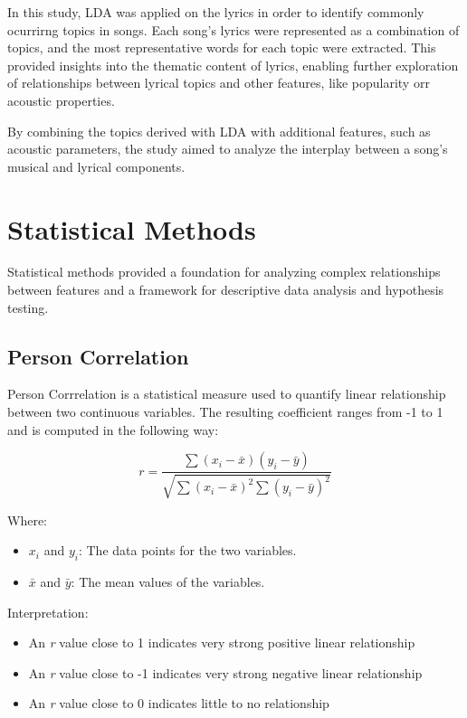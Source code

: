 In this study, LDA was applied on the lyrics in order to identify commonly
ocurrirng topics in songs. Each song's lyrics were represented as a combination
of topics, and the most representative words for each topic were extracted.
This provided insights into the thematic content of lyrics, enabling further
exploration of relationships between lyrical topics and other features, like
popularity orr acoustic properties.

By combining the topics derived with LDA with additional features, such as
acoustic parameters, the study aimed to analyze the interplay between a song's
musical and lyrical components.


\section{Statistical Methods}
\label{sec:statisticalmethods}

Statistical methods provided a foundation for analyzing complex relationships
between features and a framework for descriptive data analysis and hypothesis
testing.

\subsection{Person Correlation}

Person Corrrelation is a statistical measure used to quantify linear
relationship between two continuous variables. The resulting coefficient ranges
from -1 to 1 and is computed in the following way:

\[
r = \frac{\sum{(x_i - \bar{x})(y_i - \bar{y})}}{\sqrt{\sum{(x_i - \bar{x})^2} \sum{(y_i - \bar{y})^2}}}
\]

Where:
\begin{itemize}
    \item \( x_i \) and \( y_i \): The data points for the two variables.
    \item \( \bar{x} \) and \( \bar{y} \): The mean values of the variables.
\end{itemize}

Interpretation:
\begin{itemize}
  \item An \textit{r} value close to 1 indicates very strong positive linear relationship
  \item An \textit{r} value close to -1 indicates very strong negative linear relationship
  \item An \textit{r} value close to 0 indicates little to no relationship
\end{itemize}




